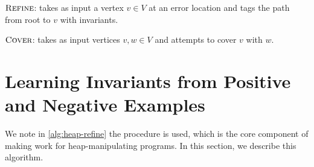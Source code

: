 \begin{algorithm}[ht]


  \caption{$\textsc{Refine}$: takes as input a vertex $v \in V$ at an error location and tags the path from root to $v$ with invariants.}
  \label{alg:heap-refine}
\end{algorithm}

\begin{algorithm}[ht]


  \caption{$\textsc{Cover}$: takes as input vertices $v, w \in V$ and attempts to cover $v$ with $w$.}
  \label{alg:heap-cover}
\end{algorithm}

\section{Learning Invariants from Positive and Negative Examples}

We note in \autoref{alg:heap-refine} the procedure \seplearner is used, which is the core component of making \impact work for heap-manipulating programs. In this section, we describe this algorithm.

